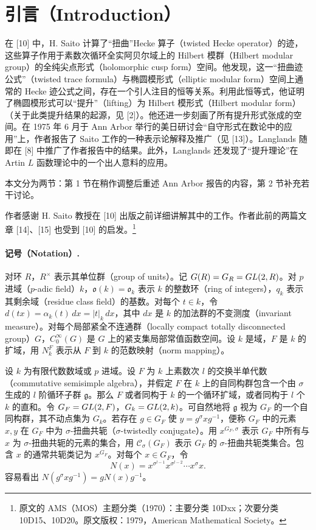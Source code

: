 
\section*{引言（Introduction）}
在 [10] 中，H. Saito 计算了“扭曲”Hecke 算子（twisted Hecke operator）的迹，这些算子作用于素数次循环全实阿贝尔域上的 Hilbert 模群（Hilbert modular group）的全纯尖点形式（holomorphic cusp form）空间。他发现，这一“扭曲迹公式”（twisted trace formula）与椭圆模形式（elliptic modular form）空间上通常的 Hecke 迹公式之间，存在一个引人注目的恒等关系。利用此恒等式，他证明了椭圆模形式可以“提升”（lifting）为 Hilbert 模形式（Hilbert modular form）（关于此类提升结果的起源，见 [2]）。他还进一步刻画了所有提升形式张成的空间。在 1975 年 6 月于 Ann Arbor 举行的美日研讨会“自守形式在数论中的应用”上，作者报告了 Saito 工作的一种表示论解释及推广（见 [13]）。Langlands 随即在 [8] 中推广了作者报告中的结果。此外，Langlands 还发现了“提升理论”在 Artin $L$ 函数理论中的一个出人意料的应用。

本文分为两节：第 1 节在稍作调整后重述 Ann Arbor 报告的内容，第 2 节补充若干讨论。

作者感谢 H. Saito 教授在 [10] 出版之前详细讲解其中的工作。作者此前的两篇文章 [14]、[15] 也受到 [10] 的启发。\footnote{原文的 AMS（MOS）主题分类（1970）：主要分类 10Dxx；次要分类 10D15、10D20。原文版权：1979，American Mathematical Society。}

\paragraph*{记号（Notation）.}
对环 $R$，$R^\times$ 表示其单位群（group of units）。记 $G(R)=G_R=GL(2,R)$。对 $p$ 进域（$p$-adic field）$k$，$\mathfrak o(k)=\mathfrak o_k$ 表示 $k$ 的整数环（ring of integers），$q_k$ 表示其剩余域（residue class field）的基数。对每个 $t\in k$，令 $d(tx)=\alpha_k(t)\,dx=|t|_k\,dx$，其中 $dx$ 是 $k$ 的加法群的不变测度（invariant measure）。对每个局部紧全不连通群（locally compact totally disconnected group）$G$，$C_0^\infty(G)$ 是 $G$ 上的紧支集局部常值函数空间。设 $k$ 是域，$F$ 是 $k$ 的扩域，用 $N_k^F$ 表示从 $F$ 到 $k$ 的范数映射（norm mapping）。

设 $k$ 为有限代数数域或 $p$ 进域。设 $F$ 为 $k$ 上素数次 $l$ 的交换半单代数（commutative semisimple algebra），并假定 $F$ 在 $k$ 上的自同构群包含一个由 $\sigma$ 生成的 $l$ 阶循环子群 $\mathfrak g$。那么 $F$ 或者同构于 $k$ 的一个循环扩域，或者同构于 $l$ 个 $k$ 的直和。令 $G_F=GL(2,F)$，$G_k=GL(2,k)$。可自然地将 $\mathfrak g$ 视为 $G_F$ 的一个自同构群，其不动点集为 $G_k$。若存在 $g\in G_F$ 使 $y=g^\sigma xg^{-1}$，便称 $G_F$ 中的元素 $x,y$ 在 $G_F$ 中为 $\sigma$-扭曲共轭（$\sigma$-twistedly conjugate）。用 $x^{G_F,\sigma}$ 表示 $G_F$ 中所有与 $x$ 为 $\sigma$-扭曲共轭的元素的集合，用 $\mathcal C_\sigma(G_F)$ 表示 $G_F$ 的 $\sigma$-扭曲共轭类集合。包含 $x$ 的通常共轭类记为 $x^{G_F}$。对每个 $x\in G_F$，令
\[
 N(x)=x^{\sigma^{l-1}}x^{\sigma^{l-2}}\cdots x^\sigma x.
\]
容易看出 $N(g^\sigma xg^{-1})=gN(x)g^{-1}$。

